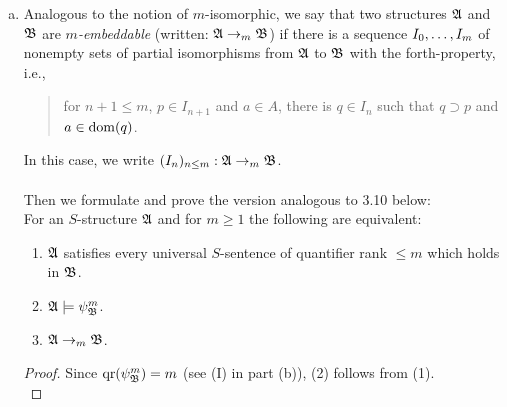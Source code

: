 \begin{enumerate}[1.]
\begin{enumerate}[(a)]
\begin{proof}
\end{proof}
Now the claim in this part of exercise immediately follows:
\begin{itemize}
\item (1) implies (2): Assume (1) holds. Then for all $n \geq 1$, we have $\struct{A} \models \psi^n_{\struct{B}}$ since $\struct{B} \models \psi^n_{\struct{B}}$ by (I). So (2) holds as well.
\item (2) implies (3): Assume (2) holds. Then for $n \geq 1$, $K_n \neq \emptyset$ by (IV)(iii). Hence $K_0 \neq \emptyset$ by (IV)(ii) (apply the forth-property to an arbitrary $p \in K_1$ and some $a \in A$). Therefore $(K_n)_{n \in \nat}: \struct{A} \finemb \struct{B}$ and (3) holds as well.
\item (3) implies (1): Assume (3) holds. Then (1) immediately follows from (V) by taking $r = 0$, $n = \qr{\varphi}$ and an arbitrary $p \in I_n$ for each universal  $S$-sentence $\varphi$ considered in (1).
\end{itemize}
\item Analogous to the notion of $m$-isomorphic, we say that two structures $\mathfrak{A}$ and $\mathfrak{B}$ are \emph{$m$-embeddable} (written: $\mathfrak{A} \rightarrow_m \mathfrak{B}$) if  there is a sequence ${I}_{0}, \ldots, {I}_{m}$ of nonempty sets of partial isomorphisms from $\mathfrak{A}$ to $\mathfrak{B}$ with the forth-property, i.e.,
\begin{quote}
for $n + 1 \leq m$, $p \in I_{n + 1}$ and $a \in A$, there is $q \in I_n$ such that $q \supset p$ and $a \in {\mathrm{dom}(q)}$.
\end{quote}
In this case, we write $(I_n)_{n \leq m}: \mathfrak{A} \rightarrow_m \mathfrak{B}$.\\
\ \\
Then we formulate and prove the version analogous to 3.10 below:\smallskip\\
For an $S$-structure $\mathfrak{A}$ and for $m \geq 1$ the following are equivalent:
\begin{enumerate}[(1)]
\item $\mathfrak{A}$ satisfies every universal $S$-sentence of quantifier rank $\leq m$ which holds in $\mathfrak{B}$.
\item $\mathfrak{A} \models \psi^m_{\mathfrak{B}}$.
\item $\mathfrak{A} \rightarrow_m \mathfrak{B}$.
\end{enumerate}
\begin{proof}
Since ${\mathrm{qr}(\psi^m_{\mathfrak{B}})} = m$ (see (I) in part (b)), (2) follows from (1).\\

\end{proof}
\end{enumerate}
\end{enumerate}
